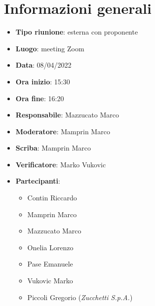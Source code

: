 \section{Informazioni generali}
\begin{itemize}
  \item \textbf{Tipo riunione}: esterna con proponente
  \item \textbf{Luogo}: meeting Zoom
  \item \textbf{Data}: 08/04/2022
  \item \textbf{Ora inizio}: 15:30
  \item \textbf{Ora fine}: 16:20
  \item \textbf{Responsabile}: Mazzucato Marco
  \item \textbf{Moderatore}: Mamprin Marco
  \item \textbf{Scriba}: Mamprin Marco
  \item \textbf{Verificatore}: Marko Vukovic
  \item \textbf{Partecipanti}:
  \begin{itemize}
    \item Contin Riccardo
    \item Mamprin Marco
    \item Mazzucato Marco
    \item Onelia Lorenzo
    \item Pase Emanuele
    \item Vukovic Marko
    \item Piccoli Gregorio (\textit{Zucchetti S.p.A.})
  \end{itemize}
\end{itemize}
